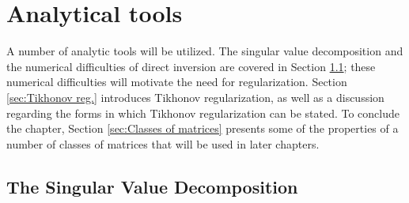 \documentclass[12pt,notitlepage]{report}
\begin{document}
\chapter{Analytical tools} \label{ch:Analytical tools}

A number of analytic tools will be utilized. The singular value decomposition and the numerical difficulties of direct inversion are covered in Section \ref{sec:SVD}; these numerical difficulties will motivate the need for regularization. Section \ref{sec:Tikhonov reg.} introduces Tikhonov regularization, as well as a discussion regarding the forms in which Tikhonov regularization can be stated.  To conclude the chapter, Section \ref{sec:Classes of matrices} presents some of the properties of a number of classes of matrices that will be used in later chapters.

\section{The Singular Value Decomposition} \label{sec:SVD}
\end{document}
